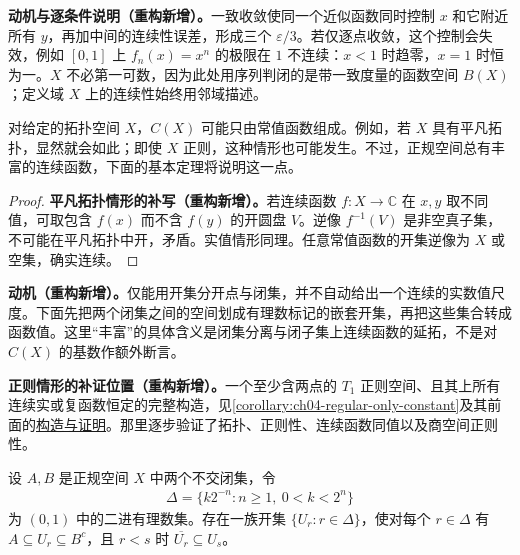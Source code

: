 \documentclass[../../main.tex]{subfiles}%
\begin{document}
\begin{remark}
\textbf{动机与逐条件说明（重构新增）。}一致收敛使同一个近似函数同时控制 $x$ 和它附近所有 $y$，再加中间的连续性误差，形成三个 $\varepsilon/3$。若仅逐点收敛，这个控制会失效，例如 $[0,1]$ 上 $f_n(x)=x^n$ 的极限在 $1$ 不连续：$x<1$ 时趋零，$x=1$ 时恒为一。$X$ 不必第一可数，因为此处用序列判闭的是带一致度量的函数空间 $B(X)$；定义域 $X$ 上的连续性始终用邻域描述。
\end{remark}
对给定的拓扑空间 $X$，$C(X)$ 可能只由常值函数组成。例如，若 $X$ 具有平凡拓扑，显然就会如此；即使 $X$ 正则，这种情形也可能发生。不过，正规空间总有丰富的连续函数，下面的基本定理将说明这一点。
\begin{proof}
\textbf{平凡拓扑情形的补写（重构新增）。}若连续函数 $f:X\to\mathbb C$ 在 $x,y$ 取不同值，可取包含 $f(x)$ 而不含 $f(y)$ 的开圆盘 $V$。逆像 $f^{-1}(V)$ 是非空真子集，不可能在平凡拓扑中开，矛盾。实值情形同理。任意常值函数的开集逆像为 $X$ 或空集，确实连续。
\end{proof}
\begin{remark}
\textbf{动机（重构新增）。}仅能用开集分开点与闭集，并不自动给出一个连续的实数值尺度。下面先把两个闭集之间的空间划成有理数标记的嵌套开集，再把这些集合转成函数值。这里“丰富”的具体含义是闭集分离与闭子集上连续函数的延拓，不是对 $C(X)$ 的基数作额外断言。
\end{remark}
\begin{remark}
\textbf{正则情形的补证位置（重构新增）。}一个至少含两点的 $T_1$ 正则空间、且其上所有连续实或复函数恒定的完整构造，见\cref{corollary:ch04-regular-only-constant}及其前面的\hyperref[supplement:ch04-regular-constant-construction]{构造与证明}。那里逐步验证了拓扑、正则性、连续函数同值以及商空间正则性。
\end{remark}
\begin{lemma}\label{lemma:ch04-dyadic-separation}
设 $A,B$ 是正规空间 $X$ 中两个不交闭集，令
\begin{align*}
\Delta=\{k2^{-n}:n\ge1,\ 0<k<2^n\}
\end{align*}
为 $(0,1)$ 中的二进有理数集。存在一族开集 $\{U_r:r\in\Delta\}$，使对每个 $r\in\Delta$ 有 $A\subseteq U_r\subseteq B^c$，且 $r<s$ 时 $\overline{U_r}\subseteq U_s$。
\end{lemma}
\end{document}

